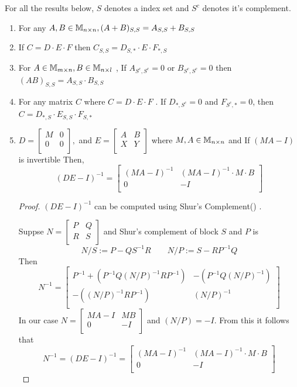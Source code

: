 \begin{HXf}
For all the results below, $S$ denotes a index set and $S^c$ denotes it's complement.
 \begin{enumerate}
  \item For any $A,B \in \mathbb{M}_{n \times n}, (A + B)_{S,S} = A_{S,S} + B_{S,S}$
  \item If $C = D \cdot E \cdot F$ then $C_{S,S} = D_{S,*} \cdot E \cdot F_{*,S}$
  \item For $A \in \mathbb{M}_{m \times n}, B \in \mathbb{M}_{n \times l}$ , If $A_{S^c, S^c} = 0$ or $B_{S^c, S^c} = 0$ then \\ $(AB)_{S,S} = A_{S,S} \cdot B_{S,S}$
  \item For any matrix $C$ where $C = D \cdot E \cdot F$ . If $D_{*, S^c} = 0$ and $F_{S^c, *} = 0$, then $C = D_{*, S} \cdot E_{S,S} \cdot F_{S,*}$
  \item $D = 
\begin{bmatrix}
M & 0 \\
0 & 0 \\
\end{bmatrix},
$ 
and $
E = 
\begin{bmatrix}
A & B \\
X & Y \\
\end{bmatrix}
$
where $M, A \in \mathbb{M}_{n \times n}$ and If $(MA - I)$ is invertible Then,
$$ (DE - I)^{-1} = \begin{bmatrix}
(MA - I)^{-1} & (MA - I)^{-1} \cdot M \cdot B \\
0 & -I \\
\end{bmatrix}
$$
\begin{proof}
 $(DE - I)^{-1}$ can be computed using Shur's Complement(\cite{wiki:shur}) . 
 
 Suppse $N =  
\begin{bmatrix}
P & Q \\
R & S \\
\end{bmatrix}
$ and Shur's complement of block $S$ and $P$ is  $$N / S := P - QS^{-1}R \qquad N / P := S - RP^{-1}Q$$
Then $$N^{-1} = 
\begin{bmatrix}
P^{-1} + (P^{-1} Q (N/P)^{-1} R  P^{-1}) & -(P^{-1}Q(N/P)^{-1}) \\[0.3cm]
-((N/P)^{-1}RP^{-1}) & (N/P)^{-1} \\
\end{bmatrix}
$$
In our case $N = 
\begin{bmatrix}
MA - I & MB \\
0 & -I \\
\end{bmatrix}
$ and $(N/P) = -I$. From this it follows that $$N^{-1} = (DE-I)^{-1} = \begin{bmatrix}
(MA - I)^{-1} & (MA - I)^{-1} \cdot M \cdot B \\
0 & -I \\
\end{bmatrix}
$$
\end{proof}

 \end{enumerate}

\end{HXf}

